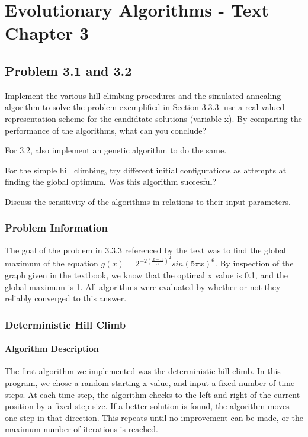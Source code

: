 
\chapter{Evolutionary Algorithms - Text Chapter 3}

\section{Problem 3.1 and 3.2}
Implement the various hill-climbing procedures and the simulated annealing algorithm to solve the problem exemplified in Section 3.3.3. use a real-valued representation scheme for the candidtate solutions (variable x). By comparing the performance of the algorithms, what can you conclude?

For 3.2, also implement an genetic algorithm to do the same.

For the simple hill climbing, try different initial configurations as attempts at finding the global optimum. Was this algorithm succesful?

Discuss the sensitivity of the algorithms in relations to their input parameters.

\subsection{Problem Information}

The goal of the problem in 3.3.3 referenced by the text was to find the global maximum of the equation $g(x) = 2^{-2(\frac{x-.1}{.9})^2}sin(5\pi x)^6$. By inspection of the graph given in the textbook, we know that the optimal x value is 0.1, and the global maximum is 1. All algorithms were evaluated by whether or not they reliably converged to this answer.

\subsection{Deterministic Hill Climb}

\subsubsection{Algorithm Description}
The first algorithm we implemented was the deterministic hill climb. In this program, we chose a random starting x value, and input a fixed number of time-steps. At each time-step, the algorithm checks to the left and right of the current position by a fixed step-size. If a better solution is found, the algorithm moves one step in that direction. This repeats until no improvement can be made, or the maximum number of iterations is reached.

